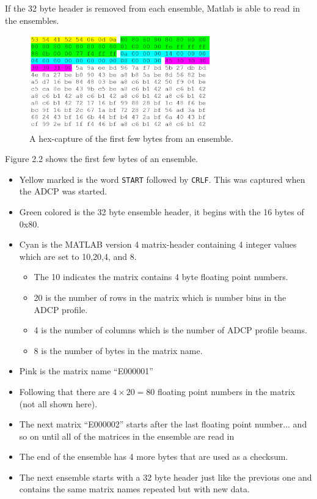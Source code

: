 If the 32 byte header is removed from each ensemble, Matlab is able to read in the ensembles.
\begin{figure}[h]
\centering
      \includegraphics[width=0.7\textwidth]{hexdump}
        \caption{A hex-capture of the first few bytes from an ensemble.}
\end{figure}
Figure 2.2 shows the first few bytes of an ensemble.
\begin{itemize}
\item Yellow marked is the word \texttt{START} followed by \texttt{CRLF}. This was captured when the ADCP was started.
\item Green colored is the 32 byte ensemble header, it begins with the 16 bytes of 0x80.
\item Cyan is the MATLAB version 4 matrix-header containing 4 integer values which are set to 10,20,4, and 8.  
\begin{itemize}
\item The 10 indicates the matrix contains 4 byte floating point numbers. 
\item 20 is the number of rows in the matrix which is number bins in the ADCP profile. 
\item 4 is the number of columns which is the number of ADCP profile beams.  
\item 8 is the number of bytes in the matrix name.  
\end{itemize}
\item Pink is the matrix name ``E000001''
\item Following that there are $4 \times 20 = 80$  floating point numbers in the matrix (not all shown here).
\item The next matrix ``E000002'' starts after the last floating point number... and so on until all of the matrices in the ensemble are read in
\item The end of the ensemble has 4 more bytes that are used as a checksum. 
\item The next ensemble starts with a 32 byte header just like the previous one and contains the same matrix names repeated but with new data. 
\end{itemize}

